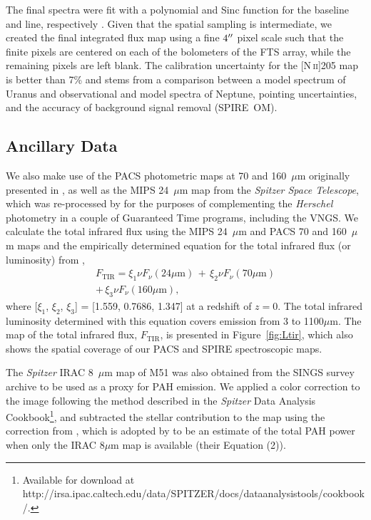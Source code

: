 The final spectra were fit with a polynomial and Sinc function for the baseline and line, respectively \citep[see][ for details]{Schirm_2013_submitted}. Given that the spatial sampling is intermediate, we created the final integrated flux map using a fine $4\mbox{$^{\prime\prime}$}$ pixel scale such that the finite pixels are centered on each of the bolometers of the FTS array, while the remaining pixels are left blank.  The calibration uncertainty for the [N\,\textsc{ii}]205 map is better than 7\% and stems from a comparison between a model spectrum of Uranus and observational and model spectra of Neptune, pointing uncertainties, and the accuracy of background signal removal (SPIRE~OM).

\subsection{Ancillary Data}\label{ancillary}
We also make use of the PACS photometric maps at 70 and 160~$\mu$m originally presented in \citet{2012ApJ...755..165M}, as well as the MIPS 24~$\mu$m map from the \emph{Spitzer Space Telescope}, which was re-processed by \citet{2012MNRAS.423..197B} for the purposes of complementing the \emph{Herschel} photometry in a couple of Guaranteed Time programs, including the VNGS.  We calculate the total infrared flux using the MIPS 24~$\mu$m and PACS 70 and 160~$\mu$m maps and the empirically determined equation for the total infrared flux (or luminosity) from \citet{2002ApJ...576..159D},
\begin{eqnarray}\label{eqn:Ftir3}
F_{\mathrm{TIR}} = \xi_{1}\nu F_{\nu}(24 \mu\mathrm{m}) \, + \, \xi_{2}\nu F_{\nu}(70 \mu\mathrm{m})
	\nonumber \\
	+ \, \xi_{3}\nu F_{\nu}(160 \mu\mathrm{m}),
\end{eqnarray}
where [$\xi_{1}$, $\xi_{2}$, $\xi_{3}$] = [1.559, 0.7686, 1.347] at a redshift of $z=0$.  The total infrared luminosity determined with this equation covers emission from 3 to 1100$\mu$m.  The map of the total infrared flux, $F_{\mathrm{TIR}}$, is presented in Figure~\ref{fig:Ltir}, which also shows the spatial coverage of our PACS and SPIRE spectroscopic maps.

The \emph{Spitzer} IRAC 8~$\mu$m map of M51 was also obtained from the SINGS survey \citep{2003PASP..115..928K} archive to be used as a proxy for PAH emission.  We applied a color correction to the image following the method described in the \emph{Spitzer} Data Analysis Cookbook\footnote{Available for download at http://irsa.ipac.caltech.edu/data/SPITZER/docs/dataanalysistools/\-cookbook/.}, and subtracted the stellar contribution to the map using the correction from \citet{2010ApJ...715..506M}, which is adopted by \citet{2012ApJ...747...81C} to be an estimate of the total PAH power when only the IRAC 8$\mu$m map is available (their Equation (2)).

